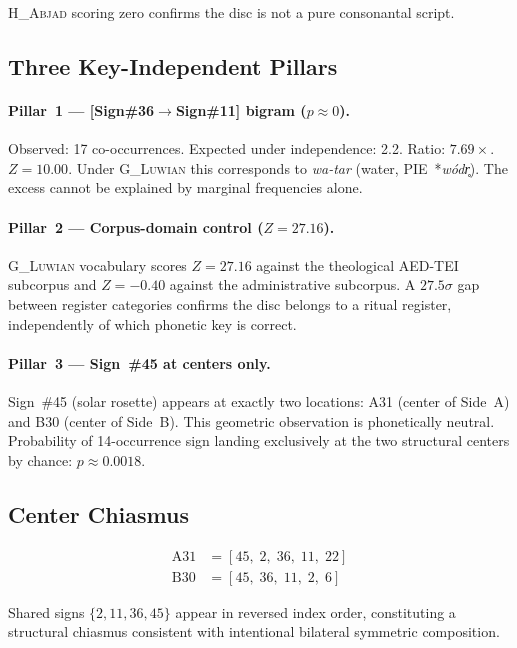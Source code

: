 \documentclass[12pt,a4paper]{article}
\begin{document}
\textsc{H\_Abjad} scoring zero confirms the disc is not a pure consonantal script.

\subsection{Three Key-Independent Pillars}

\paragraph{Pillar~1 --- [Sign\#36$\to$Sign\#11] bigram ($p \approx 0$).}
Observed: 17 co-occurrences. Expected under independence: 2.2. Ratio: $7.69\times$. $Z = 10.00$. Under \textsc{G\_Luwian} this corresponds to \textit{wa-tar} (water, PIE~*\textit{wódr̥}). The excess cannot be explained by marginal frequencies alone.

\paragraph{Pillar~2 --- Corpus-domain control ($Z = 27.16$).}
\textsc{G\_Luwian} vocabulary scores $Z = 27.16$ against the theological AED-TEI subcorpus and $Z = -0.40$ against the administrative subcorpus. A $27.5\sigma$ gap between register categories confirms the disc belongs to a ritual register, independently of which phonetic key is correct.

\paragraph{Pillar~3 --- Sign~\#45 at centers only.}
Sign~\#45 (solar rosette) appears at exactly two locations: A31 (center of Side~A) and B30 (center of Side~B). This geometric observation is phonetically neutral. Probability of 14-occurrence sign landing exclusively at the two structural centers by chance: $p \approx 0.0018$.

\subsection{Center Chiasmus}

\begin{align*}
\text{A31} &= [45,\; 2,\; 36,\; 11,\; 22] \\
\text{B30} &= [45,\; 36,\; 11,\; 2,\; 6]
\end{align*}

Shared signs $\{2, 11, 36, 45\}$ appear in reversed index order, constituting a structural chiasmus consistent with intentional bilateral symmetric composition.
\end{document}
